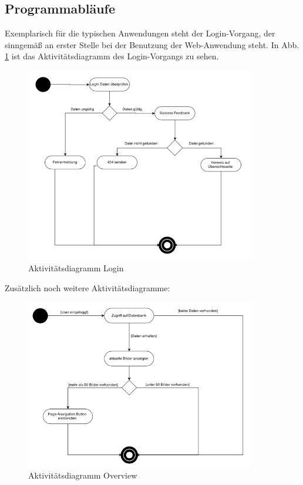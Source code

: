 \documentclass[12pt, oneside, a4paper]{article}		%
\begin{document}
\subsection{Programmabläufe}

Exemplarisch für die typischen Anwendungen steht der Login-Vorgang, der sinngemäß an erster Stelle bei der Benutzung der Web-Anwendung steht. In Abb. \ref{AcitivityDiagramLogin} ist das Aktivitätsdiagramm des Login-Vorgangs zu sehen.

\begin{figure}[H]
	\centering
	\includegraphics[width=10cm]{footage/ZIMG_ActivityDiagram_Login} 
	\caption{Aktivitätsdiagramm Login}
	\label{AcitivityDiagramLogin}
\end{figure}

Zusätzlich noch weitere Aktivitätsdiagramme:

\begin{figure}[H]
	\centering
	\includegraphics[width=10cm]{footage/ZIMG_ActivityDiagram_Overview} 
	\caption{Aktivitätsdiagramm Overview}
	\label{AcitivityDiagramOverview}
\end{figure}
\end{document}
